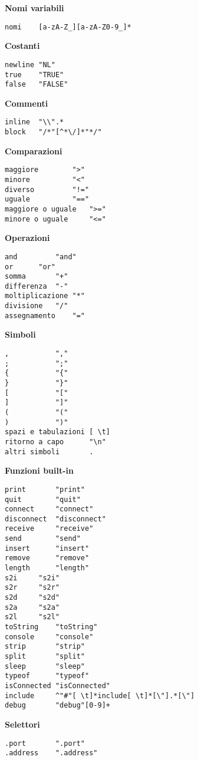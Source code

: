 \documentclass[10pt]{article}
\begin{document}
\textbf{Nomi variabili}
\begin{lstlisting}[breaklines=true, postbreak=\mbox{{$\hookrightarrow$}\space}]
nomi	[a-zA-Z_][a-zA-Z0-9_]*
\end{lstlisting}

\textbf{Costanti}
\begin{lstlisting}[breaklines=true, postbreak=\mbox{{$\hookrightarrow$}\space}]
newline	"NL"
true	"TRUE"
false	"FALSE"
\end{lstlisting}

\textbf{Commenti}
\begin{lstlisting}[breaklines=true, postbreak=\mbox{{$\hookrightarrow$}\space}]
inline	"\\".*
block	"/*"[^*\/]*"*/"
\end{lstlisting}

\textbf{Comparazioni}
\begin{lstlisting}[breaklines=true, postbreak=\mbox{{$\hookrightarrow$}\space}]
maggiore		">"
minore			"<"
diverso			"!="
uguale			"=="
maggiore o uguale	">="
minore o uguale		"<="
\end{lstlisting}

\textbf{Operazioni}
\begin{lstlisting}[breaklines=true, postbreak=\mbox{{$\hookrightarrow$}\space}]
and 		"and"
or		"or"
somma		"+"
differenza	"-"
moltiplicazione	"*"
divisione	"/"
assegnamento	"="
\end{lstlisting}

\textbf{Simboli}
\begin{lstlisting}[breaklines=true, postbreak=\mbox{{$\hookrightarrow$}\space}]
,			","
;			";"
{			"{"
}			"}"
[			"["
]			"]"
(			"("
)			")"
spazi e tabulazioni	[ \t]
ritorno a capo		"\n"
altri simboli		.
\end{lstlisting}


\textbf{Funzioni built-in}
\begin{lstlisting}[breaklines=true, postbreak=\mbox{{$\hookrightarrow$}\space}]
print		"print" 
quit		"quit"
connect		"connect"
disconnect	"disconnect"
receive		"receive"
send		"send"
insert		"insert"
remove		"remove"
length		"length"
s2i		"s2i"
s2r		"s2r"
s2d		"s2d"
s2a		"s2a"	
s2l		"s2l"
toString	"toString"
console		"console"
strip		"strip"
split		"split"
sleep		"sleep"
typeof		"typeof"
isConnected	"isConnected"
include		^"#"[ \t]*include[ \t]*[\"].*[\"]
debug		"debug"[0-9]+
\end{lstlisting}

\textbf{Selettori}
\begin{lstlisting}[breaklines=true, postbreak=\mbox{{$\hookrightarrow$}\space}]
.port		".port"
.address	".address"
\end{lstlisting}
\end{document}
